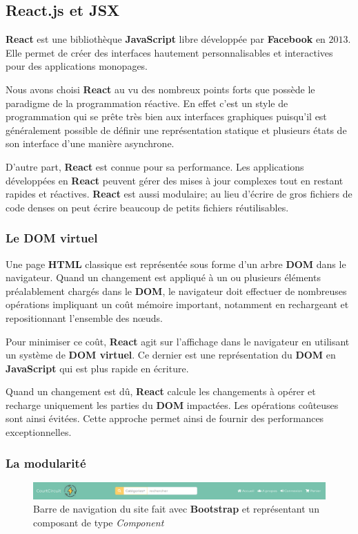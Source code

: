 \documentclass[a4paper,12pt]{report}
\theoremstyle{break}
\theoremstyle{break}
\theoremstyle{break}
\theoremstyle{break}
\theoremstyle{definition}
\theoremstyle{remark}
\begin{document}
\subsection{React.js et JSX}
\textbf{React} est une bibliothèque \textbf{JavaScript} libre développée par \textbf{Facebook} en $2013$. Elle permet de créer des interfaces hautement personnalisables et interactives pour des applications monopages.

Nous avons choisi \textbf{React} au vu des nombreux points forts que possède le paradigme de la programmation réactive. En effet c’est un style de programmation qui se prête très bien aux interfaces graphiques puisqu’il est généralement possible de définir une représentation statique et plusieurs états de son interface d'une manière asynchrone.

D’autre part, \textbf{React} est connue pour sa performance. Les applications développées en \textbf{React} peuvent gérer des mises à jour complexes tout en restant rapides et réactives. \textbf{React} est aussi modulaire; au lieu d’écrire de gros fichiers de code denses on peut écrire beaucoup de petits fichiers réutilisables.

\subsubsection{Le DOM virtuel}
Une page \textbf{HTML} classique est représentée sous forme d'un arbre \textbf{DOM} dans le navigateur. Quand un changement est appliqué à un ou plusieurs éléments préalablement chargés dans le \textbf{DOM}, le navigateur doit effectuer de nombreuses opérations impliquant un coût mémoire important, notamment en rechargeant et repositionnant l’ensemble des n\oe{}uds.

Pour minimiser ce coût, \textbf{React} agit sur l’affichage dans le navigateur en utilisant un système de \textbf{DOM virtuel}. Ce dernier est une représentation du \textbf{DOM} en \textbf{JavaScript} qui est plus rapide en écriture.

Quand un changement est dû, \textbf{React} calcule les changements à opérer et recharge uniquement les parties du \textbf{DOM} impactées. Les opérations coûteuses sont ainsi évitées. Cette approche permet ainsi de fournir des performances exceptionnelles.

\subsubsection{La modularité}
\begin{figure}[!ht]
  \centering
  \includegraphics[scale=0.35]{images/header_navbar_component.png}
  \caption{Barre de navigation du site fait avec \textbf{Bootstrap} et représentant un composant de type \textit{Component}}
  \label{fig:header_navbar_component}
\end{figure}
\end{document}
